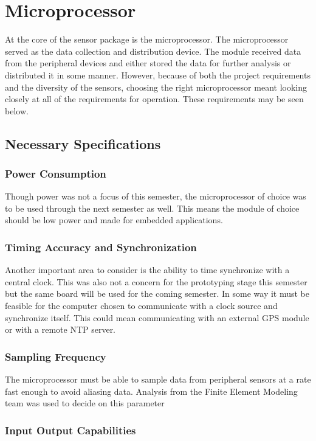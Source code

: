 \section{Microprocessor}
\label{sec:uProcessor}
\indent At the core of the sensor package is the microprocessor. The
microprocessor served as the data collection and distribution
device. The module received data from the peripheral devices and
either stored the data for further analysis or distributed it in
some manner. However, because of both the project requirements
and the diversity of the sensors, choosing the right
microprocessor meant looking closely at all of the requirements
for operation. These requirements may be seen below. 
\subsection{Necessary Specifications}
\subsubsection{Power Consumption}

\indent Though power was not a focus of this semester, the
microprocessor of choice was to be used through the next semester
as well. This means the module of choice should be low power and
made for embedded applications. 

\subsubsection{Timing Accuracy and Synchronization}

\indent Another important area to consider is the ability to time
synchronize with a central clock. This was also not a concern for
the prototyping stage this semester but the same board will be used
for the coming semester. In some way it must be feasible for the
computer chosen to communicate with a clock source and
synchronize itself. This could mean communicating with an
external GPS module or with a remote NTP server. 
\subsubsection{Sampling Frequency}

The microprocessor must be able to sample data from peripheral sensors at a rate fast enough to avoid aliasing data. Analysis from the Finite Element Modeling team was used to decide on this parameter

\subsubsection{Input Output Capabilities}

